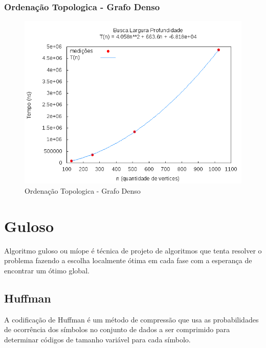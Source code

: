 \documentclass[12pt,a4paper,twoside]{report}
\begin{document}
\subsection{Ordenação Topologica - Grafo Denso}
\begin{figure}[H]
    \centering
    \includegraphics[width=0.7\linewidth]{graficos/OrdenaTopologico/Denso/Denso.png}
  \caption{Ordenação Topologica - Grafo Denso}
\end{figure}

\chapter{Guloso}

Algoritmo guloso ou míope é técnica de projeto de algoritmos que tenta resolver o problema fazendo a escolha localmente ótima em cada fase com a esperança de encontrar um ótimo global.

\section{Huffman}

A codificação de Huffman é um método de compressão que usa as probabilidades de ocorrência dos símbolos no conjunto de dados a ser comprimido para determinar códigos de tamanho variável para cada símbolo.
\end{document}
